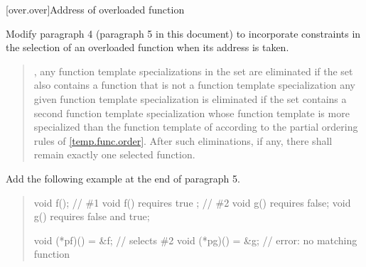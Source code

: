 [over.over]{Address of overloaded function}

Modify paragraph 4 (paragraph 5 in this document) to incorporate 
constraints in the selection of an overloaded function when its address is 
taken.

\begin{quote}
\setcounter{Paras}{3}
\pnum
{}
%
, 
any function template specializations in the set are eliminated if the 
set also contains a function that is not a function template
specialization
% 
%
 any given function template specialization
 is eliminated if the set contains a second function 
template specialization whose function template is more specialized than 
the function template of  according to the partial ordering 
rules of \ref{temp.func.order}.
%
After such eliminations, if any, there shall remain exactly one 
selected function.
\end{quote}

Add the following example at the end of paragraph 5.

\begin{quote}
\enterexample
\begin{codeblock}
void f();                // \#1
void f() requires true ; // \#2
void g() requires false;
void g() requires false and true;

void (*pf)() = &f;         // selects \#2
void (*pg)() = &g;         // error: no matching function
\end{codeblock}
\exitexample
\end{quote}
